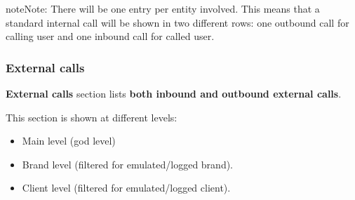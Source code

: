 \documentclass[letterpaper,10pt,english]{sphinxmanual}
\begin{document}
\begin{notice}{note}{Note:}
There will be one entry per entity involved. This means that a standard internal call will be shown
in two different rows: one outbound call for calling user and one inbound call for called user.
\end{notice}


\subsubsection{External calls}
\label{administration_portal/client/residential/calls/external_calls::doc}\label{administration_portal/client/residential/calls/external_calls:external-calls}
\textbf{External calls} section lists \textbf{both inbound and outbound external calls}.

This section is shown at different levels:
\begin{itemize}
\item {} 
Main level (god level)

\item {} 
Brand level (filtered for emulated/logged brand).

\item {} 
Client level (filtered for emulated/logged client).

\end{itemize}
\end{document}
